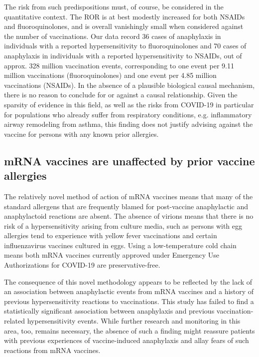 \documentclass{article}
\begin{document}
The risk from such predispositions must, of course, be considered in the quantitative context.
The ROR is at best modestly increased for both NSAIDs and fluoroquinolones, and is overall vanishingly small when considered against the number of vaccinations.
Our data record 36 cases of anaphylaxis in individuals with a reported hypersensitivity to fluoroquinolones and 70 cases of anaphylaxis in individuals with a reported hypersensitivity to NSAIDs, out of approx. 328 million vaccination events, corresponding to one event per 9.11 million vaccinations (fluoroquinolones) and one event per 4.85 million vaccinations (NSAIDs).
In the absence of a plausible biological causal mechanism, there is no reason to conclude for or against a causal relationship.
Given the sparsity of evidence in this field, as well as the risks from COVID-19 in particular for populations who already suffer from respiratory conditions, e.g. inflammatory airway remodeling from asthma, this finding does not justify advising against the vaccine for persons with any known prior allergies.


\subsection{mRNA vaccines are unaffected by prior vaccine allergies}

The relatively novel method of action of mRNA vaccines means that many of the standard allergens that are frequently blamed for post-vaccine anaphylactic and anaphylactoid reactions are absent.
The absence of virions means that there is no risk of a hypersensitivity arising from culture media, such as persons with egg allergies tend to experience with yellow fever vaccinations and certain influenzavirus vaccines cultured in eggs.
Using a low-temperature cold chain means both mRNA vaccines currently approved under Emergency Use Authorizations for COVID-19 are preservative-free.

The consequence of this novel methodology appears to be reflected by the lack of an association between anaphylactic events from mRNA vaccines and a history of previous hypersensitivity reactions to vaccinations.
This study has failed to find a statistically significant association between anaphylaxis and previous vaccination-related hypersensitivity events.
While further research and monitoring in this area, too, remains necessary, the absence of such a finding might reassure patients with previous experiences of vaccine-induced anaphylaxis and allay fears of such reactions from mRNA vaccines.
\end{document}
